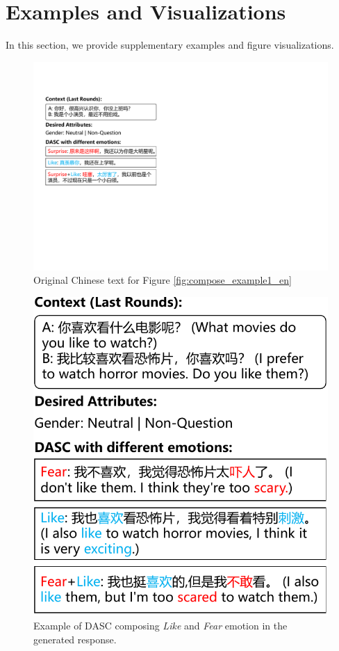 \section{Examples and Visualizations}

In this section, we provide supplementary examples and figure visualizations. 

\begin{figure}[ht]
    \centering
    \includegraphics[width=1.0\columnwidth]{figures/compose_example1_zh.pdf}
    \caption{Original Chinese text for Figure \ref{fig:compose_example1_en}}
    \label{fig:compose_example1_zh}
\end{figure}

\begin{figure}[ht]
    \centering
    \includegraphics[width=1.0\columnwidth]{figures/compose_example2.pdf}
    \caption{Example of DASC composing \textit{Like} and \textit{Fear} 
emotion in the generated response.}
    \label{fig:compose_example2}
\end{figure}

